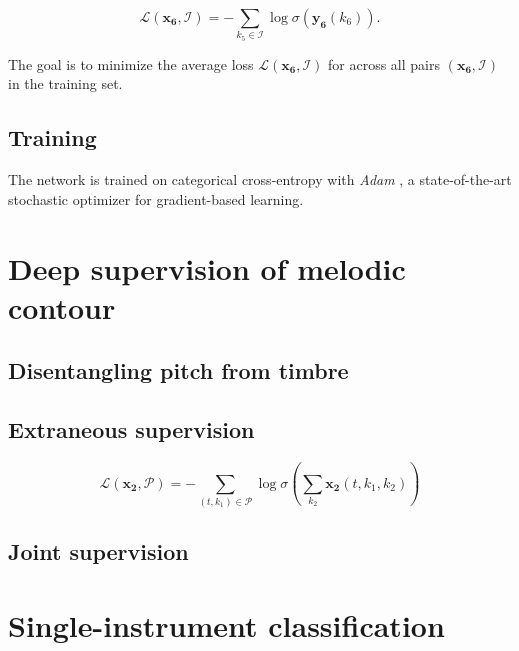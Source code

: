 \documentclass{article}
\begin{document}
\begin{equation}
\mathscr{L}(\boldsymbol{x_6}, \mathcal{I}) =
- \sum_{k_5 \in \mathcal{I}} \log \sigma ( \boldsymbol{y_6}(k_6) ).
\end{equation}

The goal is to minimize the average loss $\mathscr{L}(\boldsymbol{x_6}, \mathcal{I})$ for across all pairs $(\boldsymbol{x_6}, \mathcal{I})$ in the training set.

\subsection{Training}
The network is trained on categorical cross-entropy with \emph{Adam} \cite{Kingma2015}, a state-of-the-art stochastic optimizer for gradient-based learning.

\section{Deep supervision of melodic contour}
\subsection{Disentangling pitch from timbre}

\subsection{Extraneous supervision}

\begin{equation}
\mathscr{L}(\boldsymbol{x_2}, \mathcal{P}) =
- \sum_{(t,k_1)\in\mathcal{P}} 
\log \sigma
\left( \sum_{k_2} \boldsymbol{x_2}(t,k_1,k_2) \right)
\end{equation}

\subsection{Joint supervision}


\section{Single-instrument classification}\label{sec:single-instrument}
\end{document}

